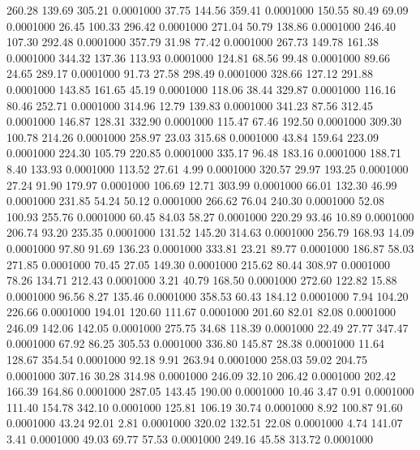  260.28  139.69  305.21   0.0001000
  37.75  144.56  359.41   0.0001000
 150.55   80.49   69.09   0.0001000
  26.45  100.33  296.42   0.0001000
 271.04   50.79  138.86   0.0001000
 246.40  107.30  292.48   0.0001000
 357.79   31.98   77.42   0.0001000
 267.73  149.78  161.38   0.0001000
 344.32  137.36  113.93   0.0001000
 124.81   68.56   99.48   0.0001000
  89.66   24.65  289.17   0.0001000
  91.73   27.58  298.49   0.0001000
 328.66  127.12  291.88   0.0001000
 143.85  161.65   45.19   0.0001000
 118.06   38.44  329.87   0.0001000
 116.16   80.46  252.71   0.0001000
 314.96   12.79  139.83   0.0001000
 341.23   87.56  312.45   0.0001000
 146.87  128.31  332.90   0.0001000
 115.47   67.46  192.50   0.0001000
 309.30  100.78  214.26   0.0001000
 258.97   23.03  315.68   0.0001000
  43.84  159.64  223.09   0.0001000
 224.30  105.79  220.85   0.0001000
 335.17   96.48  183.16   0.0001000
 188.71    8.40  133.93   0.0001000
 113.52   27.61    4.99   0.0001000
 320.57   29.97  193.25   0.0001000
  27.24   91.90  179.97   0.0001000
 106.69   12.71  303.99   0.0001000
  66.01  132.30   46.99   0.0001000
 231.85   54.24   50.12   0.0001000
 266.62   76.04  240.30   0.0001000
  52.08  100.93  255.76   0.0001000
  60.45   84.03   58.27   0.0001000
 220.29   93.46   10.89   0.0001000
 206.74   93.20  235.35   0.0001000
 131.52  145.20  314.63   0.0001000
 256.79  168.93   14.09   0.0001000
  97.80   91.69  136.23   0.0001000
 333.81   23.21   89.77   0.0001000
 186.87   58.03  271.85   0.0001000
  70.45   27.05  149.30   0.0001000
 215.62   80.44  308.97   0.0001000
  78.26  134.71  212.43   0.0001000
   3.21   40.79  168.50   0.0001000
 272.60  122.82   15.88   0.0001000
  96.56    8.27  135.46   0.0001000
 358.53   60.43  184.12   0.0001000
   7.94  104.20  226.66   0.0001000
 194.01  120.60  111.67   0.0001000
 201.60   82.01   82.08   0.0001000
 246.09  142.06  142.05   0.0001000
 275.75   34.68  118.39   0.0001000
  22.49   27.77  347.47   0.0001000
  67.92   86.25  305.53   0.0001000
 336.80  145.87   28.38   0.0001000
  11.64  128.67  354.54   0.0001000
  92.18    9.91  263.94   0.0001000
 258.03   59.02  204.75   0.0001000
 307.16   30.28  314.98   0.0001000
 246.09   32.10  206.42   0.0001000
 202.42  166.39  164.86   0.0001000
 287.05  143.45  190.00   0.0001000
  10.46    3.47    0.91   0.0001000
 111.40  154.78  342.10   0.0001000
 125.81  106.19   30.74   0.0001000
   8.92  100.87   91.60   0.0001000
  43.24   92.01    2.81   0.0001000
 320.02  132.51   22.08   0.0001000
   4.74  141.07    3.41   0.0001000
  49.03   69.77   57.53   0.0001000
 249.16   45.58  313.72   0.0001000
